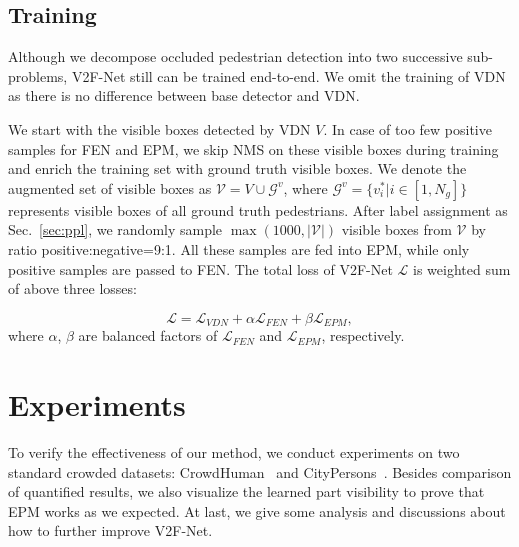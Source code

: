 \documentclass[10pt,twocolumn,letterpaper]{article}
\begin{document}
\subsection{Training}
Although we decompose occluded pedestrian detection into two successive sub-problems, V2F-Net still can be trained end-to-end. We omit the training of VDN as there is no difference between base detector and VDN.

We start with the visible boxes detected by VDN $V$. In case of too few positive samples for FEN and EPM, we skip NMS on these visible boxes during training and enrich the training set with ground truth visible boxes. We denote the augmented set of visible boxes as $\mathcal{V}=V \cup \mathcal{G}^v$, where $\mathcal{G}^v=\{v_i^*|i\in[1, N_g]\}$ represents visible boxes of all ground truth pedestrians. After label assignment as Sec.~\ref{sec:ppl}, we randomly sample $\operatorname{max}(1000, |\mathcal{V}|)$ visible boxes from $\mathcal{V}$ by ratio positive:negative=9:1. All these samples are fed into EPM, while only positive samples are passed to FEN. The total loss of V2F-Net $\mathcal{L}$ is weighted sum of above three losses:

\begin{equation}
\mathcal{L} = \mathcal{L}_{VDN}+\alpha\mathcal{L}_{FEN}+\beta\mathcal{L}_{EPM},
\label{equ: total_loss}
\end{equation}
where $\alpha$, $\beta$ are balanced factors of $\mathcal{L}_{FEN}$ and $\mathcal{L}_{EPM}$, respectively.









\section{Experiments}
To verify the effectiveness of our method, we conduct experiments on two standard crowded datasets: CrowdHuman~\cite{shao2018crowdhuman} and CityPersons~\cite{zhang2017citypersons}. Besides comparison of quantified results, we also visualize the learned part visibility to prove that EPM works as we expected. At last, we give some analysis and discussions about how to further improve V2F-Net.
\end{document}
